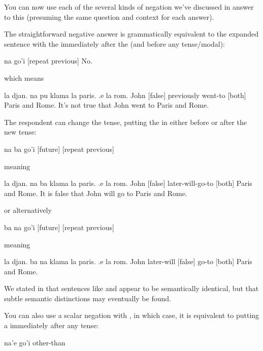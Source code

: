 You can now use each of the several kinds of negation we've
    discussed in answer to this (presuming the same question and
    context for each answer).

The straightforward negative answer is grammatically
    equivalent to the expanded sentence with the  immediately
    after the  (and before any tense/modal):
\begin{example}
na go'i\n
{} [repeat previous]\n
No.
\end{example}

{\noindent}which means
\begin{example}
la djan.  na pu klama la paris. .e la rom.\n
John [false] previously went-to [both] Paris and Rome.\n
It's not true that John went to Paris and Rome.
\end{example}

The respondent can change the tense, putting the  in
    either before or after the new tense:
\begin{example}
na ba go'i\n
{} [future] [repeat previous]
\end{example}

{\noindent}meaning
\begin{example}
la djan.  na ba klama la paris. .e la rom.\n
John [false] later-will-go-to [both] Paris and Rome.\n
It is false that John will go to Paris and Rome.
\end{example}

{\noindent}or alternatively
\begin{example}
ba na go'i\n
{} [future] [repeat previous]
\end{example}

{\noindent}meaning
\begin{example}
la djan.  ba na klama la paris. .e la rom.\n
John later-will [false] go-to [both] Paris and Rome.
\end{example}

We stated in  that sentences like and  appear to be semantically identical, but that subtle
    semantic distinctions may eventually be found.

You can also use a scalar negation with , in which
    case, it is equivalent to putting a  immediately
    after any tense:
\begin{example}
na'e go'i\n
other-than 
\end{example}


